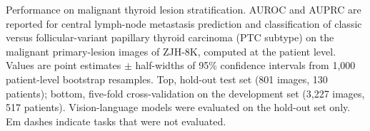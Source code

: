 \documentclass[fleqn,10pt]{wlscirep}
\begin{document}
\begin{appendices}
\clearpage

\begin{table}[p]
\centering
\begin{threeparttable}

\caption{Performance on malignant thyroid lesion stratification. AUROC and AUPRC are reported for central lymph-node metastasis prediction and classification of classic versus follicular-variant papillary thyroid carcinoma (PTC subtype) on the malignant primary-lesion images of ZJH-8K, computed at the patient level. Values are point estimates $\pm$ half-widths of 95\% confidence intervals from 1{,}000 patient-level bootstrap resamples. Top, hold-out test set (801 images, 130 patients); bottom, five-fold cross-validation on the development set (3{,}227 images, 517 patients). Vision-language models were evaluated on the hold-out set only. Em dashes indicate tasks that were not evaluated.}
\label{tab:Malignant_images_tasks_performance}

\footnotesize
\setlength{\tabcolsep}{5.5pt}
\renewcommand{\arraystretch}{1.08}


\end{threeparttable}
\end{table}
\end{appendices}
\end{document}
